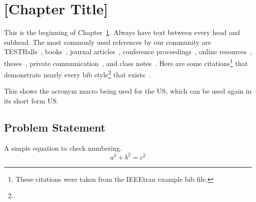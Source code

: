 \chapter{[Chapter Title]}\label{ch:common}

This is the beginning of Chapter~\ref{ch:common}. Always have text between every head
and subhead. The most commonly used references by our community are
   TESTBalls~\cite{appleton2014additive},
   books~\cite{IEEEexample:book_typical},
   journal articles~\cite{IEEEexample:article_typical},
   conference proceedings~\cite{IEEEexample:conf_typical},
   online resources~\cite{IEEEhowto:IEEEtranpage},
   theses~\cite{IEEEexample:masters},
   private communication~\cite{IEEEexample:private}, and
   class notes~\cite{NPSexample:notes}.
Here are some citations\footnote{These citations were taken
from the IEEEtran example bib file.} that demonstrate nearly every bib 
style\footnote{\lipsum[10]} that exists~\cite{IEEEhowto:IEEEtranpage,
IEEEexample:shellCTANpage,IEEEexample:bibtexuser,IEEEexample:bibtexdesign,
IEEEexample:tamethebeast,IEEEexample:bibtexguide,
IEEEexample:article_typical,IEEEexample:articleetal,IEEEexample:conf_typical,
IEEEexample:book_typical,IEEEexample:articlelargepages,
IEEEexample:articledualmonths,IEEEexample:TBParticle,
IEEEexample:bookwitheditor,IEEEexample:book,IEEEexample:bookwithseriesvolume,
IEEEexample:inbook,IEEEexample:inbookpagesnote,IEEEexample:incollection,
IEEEexample:incollectionwithseries,IEEEexample:incollection_chpp,
IEEEexample:incollectionmanyauthors,
IEEEexample:motmanualhowpub,IEEEexample:confwithadddays,
IEEEexample:confwithvolume,IEEEexample:confwithpaper,
IEEEexample:confwithpapertype,IEEEexample:presentedatconf,
IEEEexample:masters,IEEEexample:masterstype,IEEEexample:phdurl,
IEEEexample:techrep,IEEEexample:techreptype,IEEEexample:techreptypeii,
IEEEexample:techrepstdsub,IEEEexample:unpublished,IEEEexample:electronhowinfo,
IEEEexample:electronhowinfo2,IEEEexample:electronorgadd,IEEEexample:uspat,
IEEEexample:jppat,IEEEexample:frenchpatreq,
IEEEexample:standard,IEEEexample:standardproposed,IEEEexample:draftasmisc,
IEEEexample:miscforum,IEEEexample:whitepaper,IEEEexample:datasheet,
IEEEexample:private,IEEEexample:miscrfc,IEEEexample:softmanual,
IEEEexample:softonline,IEEEexample:miscgermanreg,IEEEexample:bluebookstandard
}.

This shows the acronym macro being used for the \ac{US}, which can
be used again in its short form \ac{US}.

\section{Problem Statement}\label{sec:Problem Statement}
A simple equation to check numbering.
\begin{equation}
a^2 + b^2 = c^2
\end{equation}

